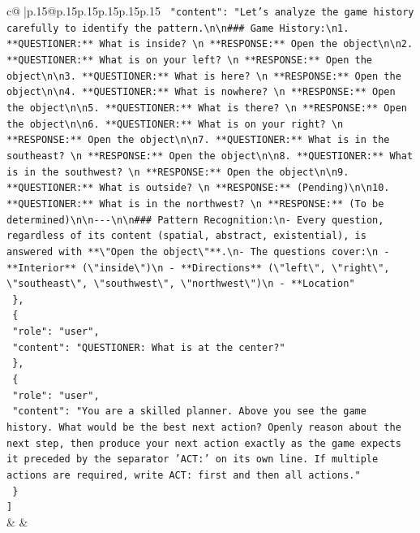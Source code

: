 \documentclass{article}
\begin{document}
{\begin{supertabular}{c@{$\;$}|p{.15\linewidth}@{}p{.15\linewidth}p{.15\linewidth}p{.15\linewidth}p{.15\linewidth}p{.15\linewidth}}
{{{\texttt{    "content": "Let's analyze the game history carefully to identify the pattern.\textbackslash{}n\textbackslash{}n\#\#\# Game History:\textbackslash{}n1. **QUESTIONER:** What is inside?  \textbackslash{}n   **RESPONSE:** Open the object\textbackslash{}n\textbackslash{}n2. **QUESTIONER:** What is on your left?  \textbackslash{}n   **RESPONSE:** Open the object\textbackslash{}n\textbackslash{}n3. **QUESTIONER:** What is here?  \textbackslash{}n   **RESPONSE:** Open the object\textbackslash{}n\textbackslash{}n4. **QUESTIONER:** What is nowhere?  \textbackslash{}n   **RESPONSE:** Open the object\textbackslash{}n\textbackslash{}n5. **QUESTIONER:** What is there?  \textbackslash{}n   **RESPONSE:** Open the object\textbackslash{}n\textbackslash{}n6. **QUESTIONER:** What is on your right?  \textbackslash{}n   **RESPONSE:** Open the object\textbackslash{}n\textbackslash{}n7. **QUESTIONER:** What is in the southeast?  \textbackslash{}n   **RESPONSE:** Open the object\textbackslash{}n\textbackslash{}n8. **QUESTIONER:** What is in the southwest?  \textbackslash{}n   **RESPONSE:** Open the object\textbackslash{}n\textbackslash{}n9. **QUESTIONER:** What is outside?  \textbackslash{}n   **RESPONSE:** (Pending)\textbackslash{}n\textbackslash{}n10. **QUESTIONER:** What is in the northwest?  \textbackslash{}n   **RESPONSE:** (To be determined)\textbackslash{}n\textbackslash{}n{-}{-}{-}\textbackslash{}n\textbackslash{}n\#\#\# Pattern Recognition:\textbackslash{}n{-} Every question, regardless of its content (spatial, abstract, existential), is answered with **\textbackslash{}"Open the object\textbackslash{}"**.\textbackslash{}n{-} The questions cover:\textbackslash{}n  {-} **Interior** (\textbackslash{}"inside\textbackslash{}")\textbackslash{}n  {-} **Directions** (\textbackslash{}"left\textbackslash{}", \textbackslash{}"right\textbackslash{}", \textbackslash{}"southeast\textbackslash{}", \textbackslash{}"southwest\textbackslash{}", \textbackslash{}"northwest\textbackslash{}")\textbackslash{}n  {-} **Location"} \\
\texttt{  \},} \\
\texttt{  \{} \\
\texttt{    "role": "user",} \\
\texttt{    "content": "QUESTIONER: What is at the center?"} \\
\texttt{  \},} \\
\texttt{  \{} \\
\texttt{    "role": "user",} \\
\texttt{    "content": "You are a skilled planner. Above you see the game history. What would be the best next action? Openly reason about the next step, then produce your next action exactly as the game expects it preceded by the separator 'ACT:' on its own line. If multiple actions are required, write ACT: first and then all actions."} \\
\texttt{  \}} \\
\texttt{{]}} \\
            }
        }
    }
    & & \\ \\


\end{supertabular}}
\end{document}
